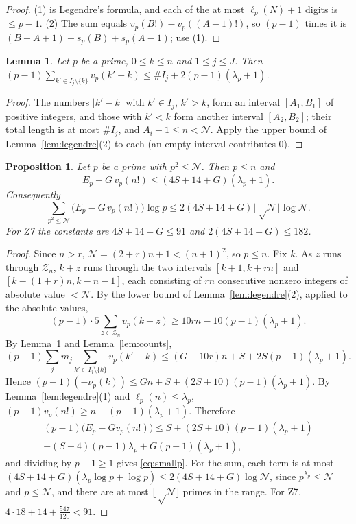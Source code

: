 \documentclass[11pt]{amsart}
\newtheorem{proposition}[theorem]{Proposition}
\newtheorem{lemma}[theorem]{Lemma}
\theoremstyle{definition}
\theoremstyle{remark}
\numberwithin{equation}{section}
\newcommand{\cN}{\mathcal{N}}
\begin{document}
\begin{proof}
(1) is Legendre's formula, and each of the at most $\ell_p(N)+1$ digits is $\le p-1$. (2) The sum equals
$v_p(B!)-v_p((A-1)!)$, so $(p-1)$ times it is $(B-A+1)-s_p(B)+s_p(A-1)$; use (1).
\end{proof}

\begin{lemma}\label{lem:polesum}
Let $p$ be a prime, $0\le k\le n$ and $1\le j\le J$. Then
$(p-1)\sum_{k'\in I_j\setminus\{k\}}v_p(k'-k)\le \#I_j+2(p-1)(\lambda_p+1)$.
\end{lemma}

\begin{proof}
The numbers $|k'-k|$ with $k'\in I_j$, $k'>k$, form an interval $[A_1,B_1]$ of positive integers, and those with
$k'<k$ form another interval $[A_2,B_2]$; their total length is at most $\#I_j$, and $A_i-1\le n<\cN$. Apply the
upper bound of Lemma~\ref{lem:legendre}(2) to each (an empty interval contributes $0$).
\end{proof}

\begin{proposition}\label{prop:smallprimes}
Let $p$ be a prime with $p^2\le\cN$. Then $p\le n$ and
\begin{equation}\label{eq:smallp}
  E_p-G\,v_p(n!)\le(4S+14+G)(\lambda_p+1).
\end{equation}
Consequently
\[
  \sum_{p^2\le\cN}\bigl(E_p-G\,v_p(n!)\bigr)\log p\le2(4S+14+G)\lfloor\sqrt\cN\rfloor\log\cN .
\]
For Z7 the constants are $4S+14+G\le91$ and $2(4S+14+G)\le182$.
\end{proposition}

\begin{proof}
Since $n>r$, $\cN=(2+r)n+1<(n+1)^2$, so $p\le n$. Fix $k$. As $z$ runs through $\mathcal Z_n$, $k+z$ runs
through the two intervals $[k+1,k+rn]$ and $[k-(1+r)n,k-n-1]$, each consisting of $rn$ consecutive nonzero
integers of absolute value $<\cN$. By the lower bound of Lemma~\ref{lem:legendre}(2), applied to the absolute
values,
\[
  (p-1)\cdot5\sum_{z\in\mathcal Z_n}v_p(k+z)\ge10rn-10(p-1)(\lambda_p+1).
\]
By Lemma~\ref{lem:polesum} and Lemma~\ref{lem:counts},
\[
  (p-1)\sum_jm_j\sum_{k'\in I_j\setminus\{k\}}v_p(k'-k)\le(G+10r)n+S+2S(p-1)(\lambda_p+1).
\]
Hence $(p-1)(-\nu_p(k))\le Gn+S+(2S+10)(p-1)(\lambda_p+1)$. By Lemma~\ref{lem:legendre}(1) and
$\ell_p(n)\le\lambda_p$, $(p-1)v_p(n!)\ge n-(p-1)(\lambda_p+1)$. Therefore
\begin{multline*}
  (p-1)\bigl(E_p-Gv_p(n!)\bigr)\le S+(2S+10)(p-1)(\lambda_p+1)\\+(S+4)(p-1)\lambda_p+G(p-1)(\lambda_p+1),
\end{multline*}
and dividing by $p-1\ge1$ gives \eqref{eq:smallp}. For the sum, each term is at most
$(4S+14+G)(\lambda_p\log p+\log p)\le2(4S+14+G)\log\cN$, since $p^{\lambda_p}\le\cN$ and $p\le\cN$, and there are at
most $\lfloor\sqrt\cN\rfloor$ primes in the range. For Z7, $4\cdot18+14+\frac{547}{120}<91$.
\end{proof}
\end{document}
